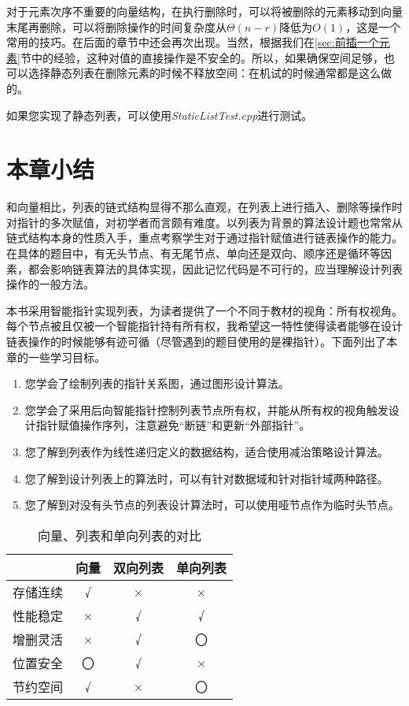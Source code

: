 对于元素次序不重要的向量结构，在执行删除时，可以将被删除的元素移动到向量末尾再删除，可以将删除操作的时间复杂度从$\Theta(n-r)$降低为$O(1)$，这是一个常用的技巧。在后面的章节中还会再次出现。当然，根据我们在\ref{sec:前插一个元素}节中的经验，这种对值的直接操作是不安全的。所以，如果确保空间足够，也可以选择静态列表在删除元素的时候不释放空间：在机试的时候通常都是这么做的。

如果您实现了静态列表，可以使用\textit{StaticListTest.cpp}进行测试。

\section{本章小结}
和向量相比，列表的链式结构显得不那么直观，在列表上进行插入、删除等操作时对指针的多次赋值，对初学者而言颇有难度。以列表为背景的算法设计题也常常从链式结构本身的性质入手，重点考察学生对于通过指针赋值进行链表操作的能力。在具体的题目中，有无头节点、有无尾节点、单向还是双向、顺序还是循环等因素，都会影响链表算法的具体实现，因此记忆代码是不可行的，应当理解设计列表操作的一般方法。

本书采用智能指针实现列表，为读者提供了一个不同于教材的视角：所有权视角。每个节点被且仅被一个智能指针持有所有权，我希望这一特性使得读者能够在设计链表操作的时候能够有迹可循（尽管遇到的题目使用的是裸指针）。下面列出了本章的一些学习目标。

\begin{enumerate}
    \item 您学会了绘制列表的指针关系图，通过图形设计算法。
    \item 您学会了采用后向智能指针控制列表节点所有权，并能从所有权的视角触发设计指针赋值操作序列，注意避免“断链”和更新“外部指针”。
    \item 您了解到列表作为线性递归定义的数据结构，适合使用减治策略设计算法。
    \item 您了解到设计列表上的算法时，可以有针对数据域和针对指针域两种路径。
    \item 您了解到对没有头节点的列表设计算法时，可以使用哑节点作为临时头节点。
\end{enumerate}

\begin{table}
  \centering
  \caption{向量、列表和单向列表的对比}
  \begin{tabular}{c|ccc}
    \toprule
  & 向量 & 双向列表 & 单向列表
      \\
    \midrule
存储连续 & √ & × & × \\
性能稳定 & × & √ & √ \\
增删灵活 & × & √ & 〇 \\
位置安全 & 〇 & √ & × \\
节约空间 & √ & × & 〇 \\
    \bottomrule
  \end{tabular}
  \label{tab:lis5}
\end{table}

